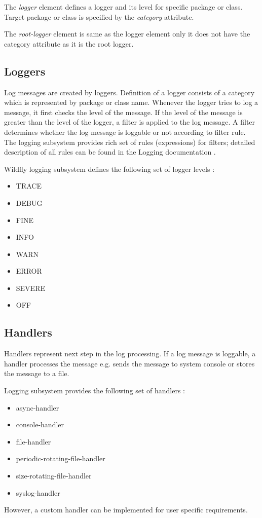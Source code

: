 \documentclass[12pt,oneside]{fithesis2}
\begin{document}
The \textit{logger} element defines a logger and its level for specific package or class. Target package or class is specified by the \textit{category} attribute.

The \textit{root-logger} element is same as the logger element only it does not have the category attribute as it is the root logger.


\subsection{Loggers}
Log messages are created by loggers. Definition of a logger consists of a category which is represented by package or class name. Whenever the logger tries to log a message, it first checks the level of the message. If the level of the message is greater than the level of the logger, a filter is applied to the log message.  A filter determines whether the log message is loggable or not according to filter rule. The logging subsystem provides rich set of rules (expressions) for filters; detailed description of all rules can be found in the Logging documentation \cite[Logging Configuration]{wildfly_doc}.

Wildfly logging subsystem defines the following set of logger levels \cite[Logging Configuration]{wildfly_doc}:

\begin{multicols}{2}
	\begin{itemize}
		\item TRACE
		\item DEBUG
		\item FINE
		\item INFO
		\item WARN
		\item ERROR
		\item SEVERE
		\item OFF
	\end{itemize}
\end{multicols}

\subsection{Handlers}
\label{handlers}
Handlers represent next step in the log processing. If a log message is loggable, a handler processes the message e.g. sends the message to system console or stores the message to a file.

Logging subsystem provides the following set of handlers \cite[Logging Configuration]{wildfly_doc}:
\begin{itemize}
	\item async-handler
	\item console-handler
	\item file-handler
	\item periodic-rotating-file-handler
	\item size-rotating-file-handler
	\item syslog-handler
\end{itemize}
\noindent
However, a custom handler can be implemented for user specific requirements.
\end{document}
